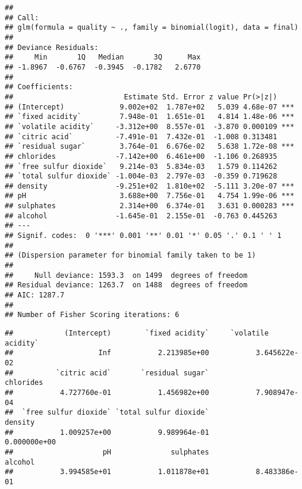 \documentclass[
]{article}
\newenvironment{Shaded}{\begin{snugshade}}{\end{snugshade}}
\newcommand{\CommentTok}[1]{\textcolor[rgb]{0.56,0.35,0.01}{\textit{#1}}}
\newcommand{\KeywordTok}[1]{\textcolor[rgb]{0.13,0.29,0.53}{\textbf{#1}}}
\newcommand{\NormalTok}[1]{#1}
\newcommand{\OperatorTok}[1]{\textcolor[rgb]{0.81,0.36,0.00}{\textbf{#1}}}
\begin{document}
\begin{verbatim}
## 
## Call:
## glm(formula = quality ~ ., family = binomial(logit), data = final)
## 
## Deviance Residuals: 
##     Min       1Q   Median       3Q      Max  
## -1.8967  -0.6767  -0.3945  -0.1782   2.6770  
## 
## Coefficients:
##                          Estimate Std. Error z value Pr(>|z|)    
## (Intercept)             9.002e+02  1.787e+02   5.039 4.68e-07 ***
## `fixed acidity`         7.948e-01  1.651e-01   4.814 1.48e-06 ***
## `volatile acidity`     -3.312e+00  8.557e-01  -3.870 0.000109 ***
## `citric acid`          -7.491e-01  7.432e-01  -1.008 0.313481    
## `residual sugar`        3.764e-01  6.676e-02   5.638 1.72e-08 ***
## chlorides              -7.142e+00  6.461e+00  -1.106 0.268935    
## `free sulfur dioxide`   9.214e-03  5.834e-03   1.579 0.114262    
## `total sulfur dioxide` -1.004e-03  2.797e-03  -0.359 0.719628    
## density                -9.251e+02  1.810e+02  -5.111 3.20e-07 ***
## pH                      3.688e+00  7.756e-01   4.754 1.99e-06 ***
## sulphates               2.314e+00  6.374e-01   3.631 0.000283 ***
## alcohol                -1.645e-01  2.155e-01  -0.763 0.445263    
## ---
## Signif. codes:  0 '***' 0.001 '**' 0.01 '*' 0.05 '.' 0.1 ' ' 1
## 
## (Dispersion parameter for binomial family taken to be 1)
## 
##     Null deviance: 1593.3  on 1499  degrees of freedom
## Residual deviance: 1263.7  on 1488  degrees of freedom
## AIC: 1287.7
## 
## Number of Fisher Scoring iterations: 6
\end{verbatim}

\begin{Shaded}
\end{Shaded}

\begin{verbatim}
##            (Intercept)        `fixed acidity`     `volatile acidity` 
##                    Inf           2.213985e+00           3.645622e-02 
##          `citric acid`       `residual sugar`              chlorides 
##           4.727760e-01           1.456982e+00           7.908947e-04 
##  `free sulfur dioxide` `total sulfur dioxide`                density 
##           1.009257e+00           9.989964e-01           0.000000e+00 
##                     pH              sulphates                alcohol 
##           3.994585e+01           1.011878e+01           8.483386e-01
\end{verbatim}
\end{document}
